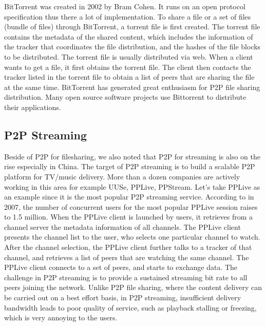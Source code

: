 BitTorrent was created in 2002 by Bram Cohen. 
It runs on an open protocol specification thus there a lot of implementation.
To share a file or a set of files (bundle of files) through BitTorrent, a torrent file is first created. 
The torrent file contains the metadata of the shared content, which includes the information of the tracker that coordinates the file distribution, and the hashes of the file blocks to be distributed. 
The torrent file is usually distributed via web.
When a client wants to get a file, it first obtains the torrent file. 
The client then contacts the tracker listed in the torrent file to obtain a list of peers that are sharing the file at the same time.  
BitTorrent has generated great enthusiasm for P2P file sharing distribution.  
Many open source software projects use Bittorrent to distribute their applications.

\subsection{P2P Streaming}
Beside of P2P for filesharing, we also noted that P2P for streaming is also on the rise especially in China.
The target of P2P streaming is to build a scalable P2P platform for TV/music delivery. 
More than a dozen companies are actively working in this area for example UUSe, PPLive, PPStream. 
Let's take PPLive as an example since it is the most popular P2P streaming service.
According to \cite{} in 2007, the number of concurrent users for the most popular PPLive session raises to 1.5 million.
When the PPLive client is launched by users, it retrieves from a channel server the metadata information of all channels. 
The PPLive client presents the channel list to the user, who selects one particular channel to watch. 
After the channel selection, the PPLive client further talks to a tracker of that channel, and retrieves a list of peers that are watching the same channel. 
The PPLive client connects to a set of peers, and starts to exchange data. 
The challenge in P2P streaming is to provide a sustained streaming bit rate to all peers joining the network. 
Unlike P2P file sharing, where the content delivery can be carried out on a best effort basis, in P2P streaming, insufficient delivery bandwidth leads to poor quality of service, such as playback stalling or freezing, which is very annoying to the users.

